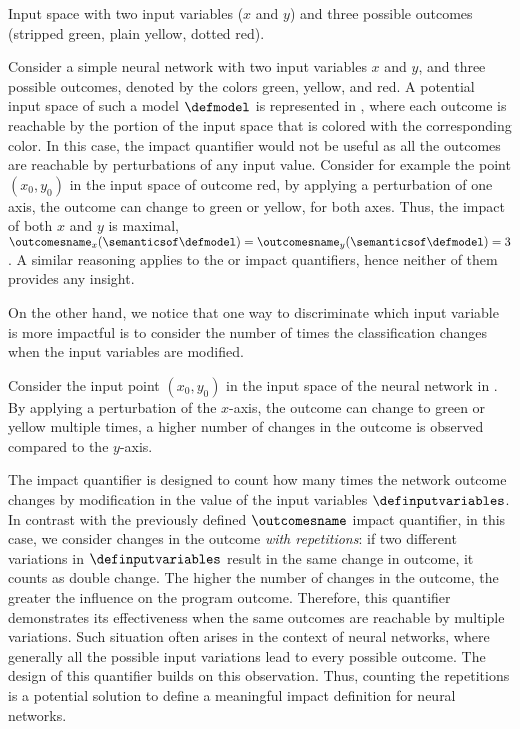 \begin{example}
\begin{marginfigure}
    \caption{Input space with two input variables ($x$ and $y$) and three possible outcomes (stripped green, plain yellow, dotted red).
    }
  \end{marginfigure}
  Consider a simple neural network with two input variables $x$ and $y$, and three possible outcomes, denoted by the colors green, yellow, and red.
  A potential input space of such a model $\defmodel$ is represented in , where each outcome is reachable by the portion of the input space that is colored with the corresponding color.
  In this case, the \outcomesname{} impact quantifier would not be useful as all the outcomes are reachable by perturbations of any input value. Consider for example the point $(x_0, y_0)$ in the input space of outcome red, by applying a perturbation of one axis, the outcome can change to green or yellow, for both axes. Thus, the impact of both $x$ and $y$ is maximal, \cf{} $\outcomesname_x(\semanticsof\defmodel) = \outcomesname_y(\semanticsof\defmodel) = 3$.
  A similar reasoning applies to the \rangename{} or \qusedname{} impact quantifiers, hence neither of them provides any insight.
\end{example}

On the other hand, we notice that one way to discriminate which input variable is more impactful is to consider the number of times the classification changes when the input variables are modified.

\begin{example}
  Consider the input point $(x_0, y_0)$ in the input space of the neural network in .
  By applying a perturbation of the $x$-axis, the outcome can change to green or yellow multiple times, a higher number of changes in the outcome is observed compared to the $y$-axis.
\end{example}


The \changesname{} impact quantifier is designed to count how many times the network outcome changes by modification in the value of the input variables $\definputvariables$.
In contrast with the previously defined $\outcomesname$ impact quantifier, in this case, we consider changes in the outcome \emph{with repetitions}: if two different variations in $\definputvariables$ result in the same change in outcome, it counts as double change.
The higher the number of changes in the outcome, the greater the influence on the program outcome.
Therefore, this quantifier demonstrates its effectiveness when the same outcomes are reachable by multiple variations.
Such situation often arises in the context of neural networks, where generally all the possible input variations lead to every possible outcome.
The design of this quantifier builds on this observation.
Thus, counting the repetitions is a potential solution to define a meaningful impact definition for neural networks.

